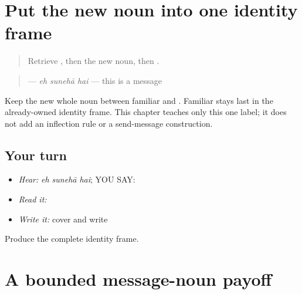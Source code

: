 \section[\texorpdfstring{\pa{ਇਹ} \pa{ਸੁਨੇਹਾ} \pa{ਹੈ} (eh sunehaa hai)}{ਇਹ ਸੁਨੇਹਾ ਹੈ (eh sunehaa hai)}]{Put the new noun into one identity frame}

\label{lesson:PA-C198-message-label}



\begin{quote}
Retrieve \textbf{}, then the new noun, then \textbf{}.
\end{quote}

\begin{grammarlens}[title={Grammar Lens}]
\begin{quote}
\textbf{  } — \emph{eh sunehā hai} — this is a message
\end{quote}

Keep the new whole noun between familiar \textbf{} and \textbf{}. Familiar \textbf{} stays last in the already-owned identity frame. This chapter teaches only this one label; it does not add an inflection rule or a send-message construction.
\end{grammarlens}

\subsection*{Your turn}
\begin{itemize}
\raggedright
  \item \emph{Hear:} \emph{eh sunehā hai}; YOU SAY: \textbf{  }
  \item \emph{Read it:} \textbf{  }
  \item \emph{Write it:} cover and write \textbf{  }
\end{itemize}

\begin{tcolorbox}[breakable,colback=teal!4,colframe=teal!35!black,title={Before you move on}]
Produce the complete identity frame.
\end{tcolorbox}
\section[\texorpdfstring{\pa{ਇਹ} \pa{ਸੁਨੇਹਾ} \pa{ਹੈ} (eh sunehaa hai)}{ਇਹ ਸੁਨੇਹਾ ਹੈ (eh sunehaa hai)}]{A bounded message-noun payoff}

